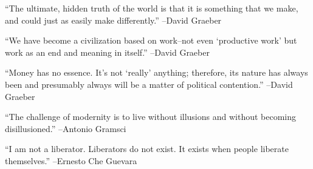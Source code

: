 \documentclass{article}%
\begin{document}
\vspace{1mm}%
\begin{minipage}{\textwidth}%
\flushleft%
“The ultimate, hidden truth of the world is that it is something that we make, and could just as easily make differently.”%
\linebreak%
\vspace{1mm}%
–David Graeber%
\linebreak%
\vspace{1mm}%
\end{minipage}%
\linebreak%
\vspace{1mm}%
\begin{minipage}{\textwidth}%
\flushleft%
“We have become a civilization based on work–not even ‘productive work’ but work as an end and meaning in itself.”%
\linebreak%
\vspace{1mm}%
–David Graeber%
\linebreak%
\vspace{1mm}%
\end{minipage}%
\linebreak%
\vspace{1mm}%
\begin{minipage}{\textwidth}%
\flushleft%
“Money has no essence. It's not ‘really’ anything; therefore, its nature has always been and presumably always will be a matter of political contention.”%
\linebreak%
\vspace{1mm}%
–David Graeber%
\linebreak%
\vspace{1mm}%
\end{minipage}%
\linebreak%
\vspace{1mm}%
\begin{minipage}{\textwidth}%
\flushleft%
“The challenge of modernity is to live without illusions and without becoming disillusioned.”%
\linebreak%
\vspace{1mm}%
–Antonio Gramsci%
\linebreak%
\vspace{1mm}%
\end{minipage}%
\linebreak%
\vspace{1mm}%
\begin{minipage}{\textwidth}%
\flushleft%
“I am not a liberator. Liberators do not exist. It exists when people liberate themselves.”%
\linebreak%
\vspace{1mm}%
–Ernesto Che Guevara%
\linebreak%
\vspace{1mm}%
\end{minipage}%
\end{document}
